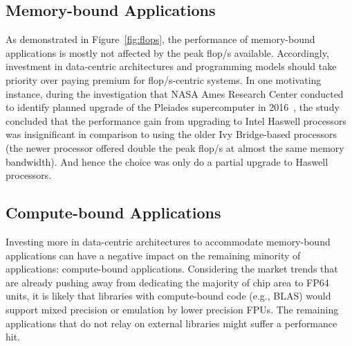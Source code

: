 \subsection{Memory-bound Applications}
As demonstrated in Figure~\ref{fig:flops}, the performance of memory-bound 
applications is mostly not affected by the peak \unit[]{flop/s} available. 
Accordingly, investment in data-centric architectures and programming models 
should take priority over paying premium for \unit[]{flop/s}-centric systems.
In one motivating instance, during the investigation that NASA Ames Research 
Center conducted to identify planned upgrade of the Pleiades supercomputer in 
2016~\cite{saini_performance_2016}, the study concluded that the performance gain from upgrading to
Intel Haswell processors was insignificant in comparison to using the older
Ivy Bridge-based processors (the newer processor offered double the peak
\unit[]{flop/s} at almost the same memory bandwidth). And hence the choice was only do a partial upgrade to Haswell processors.

\subsection{Compute-bound Applications}
Investing more in data-centric architectures to accommodate memory-bound 
applications can have a negative impact on the remaining minority of 
applications: compute-bound applications. Considering the market trends that
are already pushing away from dedicating the majority of chip area to
FP64 units, it is likely that libraries with compute-bound code (e.g., BLAS) 
would support mixed precision or emulation by lower precision FPUs. The 
remaining applications that do not relay on external libraries might suffer a 
performance hit. 





